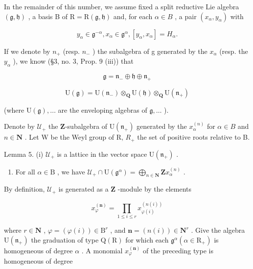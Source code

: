 In the remainder of this number, we assume fixed a split reductive Lie algebra \((\mathfrak{g},\mathfrak{h})\) , a basis B of \(\mathrm{R}=\mathrm{R}(\mathfrak{g},\mathfrak{h})\) and, for each \(\alpha\in B\) , a pair \((x_{\alpha},y_{\alpha})\) with

\[
y _ {\alpha} \in \mathfrak {g} ^ {- \alpha}, x _ {\alpha} \in \mathfrak {g} ^ {\alpha}, [ y _ {\alpha}, x _ {\alpha} ] = H _ {\alpha}.\tag{20}
\]

If we denote by \(n_{+}\) (resp. \(n_{-}\) ) the subalgebra of g generated by the \(x_{\alpha}\) (resp. the \(y_{\alpha}\) ), we know (§3, no. 3, Prop. 9 (iii)) that

\[
\mathfrak {g} = \mathfrak {n} _ {-} \oplus \mathfrak {h} \oplus \mathfrak {n} _ {+}\tag{21}
\]

\[
\mathrm{U} (\mathfrak {g}) = \mathrm{U} (\mathfrak {n} _ {-}) \otimes_ {\mathbf {Q}} \mathrm{U} (\mathfrak {h}) \otimes_ {\mathbf {Q}} \mathrm{U} (\mathfrak {n} _ {+})\tag{22}
\]

(where \(\mathrm{U}(\mathfrak{g}),\ldots\) are the enveloping algebras of \(\mathfrak{g},\ldots\) ).

Denote by \(\mathcal{U}_{+}\) the \(\mathbf{Z}\)-subalgebra of \(\mathrm{U}(\mathfrak{n}_{+})\) generated by the \(x_{\alpha}^{(n)}\) for \(\alpha \in B\) and \(n \in \mathbf{N}\) . Let W be the Weyl group of R, \(R_{+}\) the set of positive roots relative to B.

Lemma 5. (i) \(\mathcal{U}_{+}\) is a lattice in the vector space \(\mathrm{U}(\mathfrak{n}_{+})\) .

\begin{enumerate}
\def\labelenumi{(\roman{enumi})}
\setcounter{enumi}{1}
\tightlist
\item
  For all \(\alpha \in \mathrm{B}\) , we have \(\mathcal{U}_{+} \cap \mathrm{U}(\mathfrak{g}^{\alpha}) = \bigoplus_{n \in \mathbf{N}} \mathbf{Z}x_{\alpha}^{(n)}\) .
\end{enumerate}

By definition, \(\mathcal{U}_{+}\) is generated as a \(\mathbf{Z}\) -module by the elements

\[
x _ {\varphi} ^ {(\mathbf {n})} = \prod_ {1 \leq i \leq r} x _ {\varphi (i)} ^ {(n (i))}
\]

where \(r \in \mathbf{N}\) , \(\varphi = (\varphi(i)) \in \mathrm{B}^{r}\) , and \(\mathbf{n} = (n(i)) \in \mathbf{N}^{r}\) . Give the algebra \(\mathrm{U}(\mathfrak{n}_{+})\) the graduation of type \(\mathrm{Q}(\mathrm{R})\) for which each \(\mathfrak{g}^{\alpha} (\alpha \in \mathrm{R}_{+})\) is homogeneous of degree \(\alpha\) . A monomial \(x_{\varphi}^{(\mathbf{n})}\) of the preceding type is homogeneous of degree

